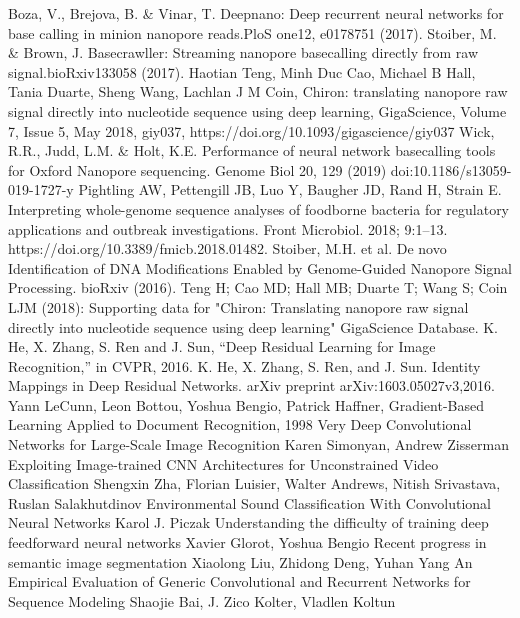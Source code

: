 \documentclass[a4paper,11pt,twoside]{report}
\theoremstyle{definition}
\begin{document}
\begin{thebibliography}{20}
Boza, V., Brejova, B. \& Vinar, T. Deepnano: Deep recurrent neural networks for base calling in minion nanopore reads.PloS one12, e0178751 (2017).
Stoiber, M. \& Brown, J. Basecrawller: Streaming nanopore basecalling directly from raw signal.bioRxiv133058 (2017).
 Haotian Teng, Minh Duc Cao, Michael B Hall, Tania Duarte, Sheng Wang, Lachlan J M Coin, Chiron: translating nanopore raw signal directly into nucleotide sequence using deep learning, GigaScience, Volume 7, Issue 5, May 2018, giy037, https://doi.org/10.1093/gigascience/giy037
Wick, R.R., Judd, L.M. \& Holt, K.E. Performance of neural network basecalling tools for Oxford Nanopore sequencing. Genome Biol 20, 129 (2019) doi:10.1186/s13059-019-1727-y
Pightling AW, Pettengill JB, Luo Y, Baugher JD, Rand H, Strain E. Interpreting whole-genome sequence analyses of foodborne bacteria for regulatory applications and outbreak investigations. Front Microbiol. 2018; 9:1–13. https://doi.org/10.3389/fmicb.2018.01482.
Stoiber, M.H. et al. De novo Identification of DNA Modifications Enabled by Genome-Guided Nanopore Signal Processing. bioRxiv (2016).
 Teng H; Cao MD; Hall MB; Duarte T; Wang S; Coin LJM (2018): Supporting data for "Chiron: Translating nanopore raw signal directly into nucleotide sequence using deep learning" GigaScience Database.
 K. He, X. Zhang, S. Ren and J. Sun, “Deep Residual Learning for Image Recognition,” in CVPR, 2016.
K. He, X. Zhang, S. Ren, and J. Sun. Identity Mappings in Deep Residual Networks. arXiv preprint arXiv:1603.05027v3,2016.
Yann LeCunn, Leon Bottou, Yoshua Bengio, Patrick Haffner, Gradient-Based Learning Applied to Document Recognition, 1998
Very Deep Convolutional Networks for Large-Scale Image Recognition Karen Simonyan, Andrew Zisserman
 Exploiting Image-trained CNN Architectures for Unconstrained Video Classification Shengxin Zha, Florian Luisier, Walter Andrews, Nitish Srivastava, Ruslan Salakhutdinov
 Environmental Sound Classification With Convolutional Neural Networks Karol J. Piczak
Understanding the difficulty of training deep feedforward neural networks Xavier Glorot, Yoshua Bengio
 Recent progress in semantic image segmentation Xiaolong Liu, Zhidong Deng, Yuhan Yang
 An Empirical Evaluation of Generic Convolutional and Recurrent Networks for Sequence Modeling Shaojie Bai, J. Zico Kolter, Vladlen Koltun

\end{thebibliography}
\end{document}
